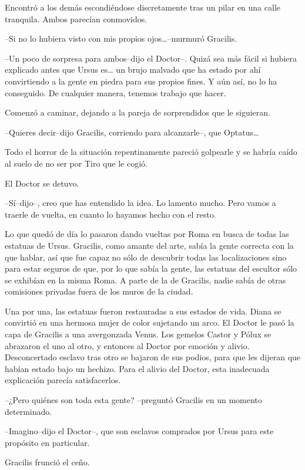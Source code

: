 Encontró a los demás escondiéndose discretamente tras un pilar en una
calle tranquila. Ambos parecían conmovidos.

--Si no lo hubiera visto con mis propios ojos\ldots{}--murmuró Gracilis.

--Un poco de sorpresa para ambos--dijo el Doctor--. Quizá sea más fácil
si hubiera explicado antes que Ursus es\ldots{} un brujo malvado que ha
estado por ahí convirtiendo a la gente en piedra para sus propios fines.
Y aún así, no lo ha conseguido. De cualquier manera, tenemos trabajo que
hacer.

Comenzó a caminar, dejando a la pareja de sorprendidos que le siguieran.

--Quieres decir--dijo Gracilis, corriendo para alcanzarle--, que
Optatus\ldots{}

Todo el horror de la situación repentinamente pareció golpearle y se
habría caído al suelo de no ser por Tiro que le cogió.

El Doctor se detuvo.

--Sí--dijo--, creo que has entendido la idea. Lo lamento mucho. Pero
vamos a traerle de vuelta, en cuanto lo hayamos hecho con el resto.

Lo que quedó de día lo pasaron dando vueltas por Roma en busca de todas
las estatuas de Ursus. Gracilis, como amante del arte, sabía la gente
correcta con la que hablar, así que fue capaz no sólo de descubrir todas
las localizaciones sino para estar seguros de que, por lo que sabía la
gente, las estatuas del escultor sólo se exhibían en la misma Roma. A
parte de la de Gracilis, nadie sabía de otras comisiones privadas fuera
de los muros de la ciudad.

Una por una, las estatuas fueron restauradas a sus estados de vida.
Diana se convirtió en una hermosa mujer de color sujetando un arco. El
Doctor le pasó la capa de Gracilis a una avergonzada Venus. Los gemelos
Castor y Pólux se abrazaron el uno al otro, y entonces al Doctor por
emoción y alivio. Desconcertado esclavo tras otro se bajaron de sus
podios, para que les dijeran que habían estado bajo un hechizo. Para el
alivio del Doctor, esta inadecuada explicación parecía satisfacerlos.

--¿Pero quiénes son toda esta gente? --preguntó Gracilis en un momento
determinado.

--Imagino--dijo el Doctor--, que son esclavos comprados por Ursus para
este propósito en particular.

Gracilis frunció el ceño.

